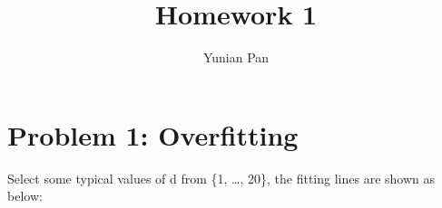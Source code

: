\documentclass[a4paper,12pt]{article}
\begin{document}
\title{\textbf{Homework 1}}
\author{Yunian Pan}
\maketitle{}

\section{Problem 1: Overfitting}

Select some typical values of d from \{1, \ldots, 20\}, the fitting lines are shown as below:
\begin{figure}[htbp]
\setcounter{subfigure}{0}
\centering
{}
\end{figure}
\\
\begin{figure}[htbp]
\centering
{}
\end{figure}
\end{document}
